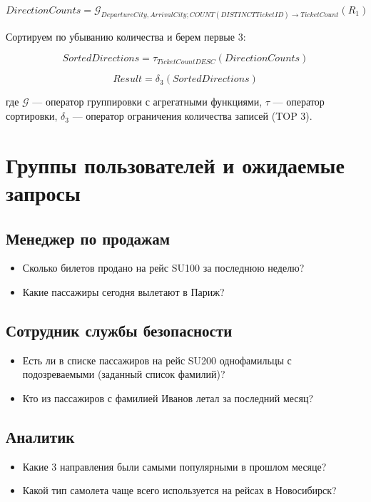 \documentclass[a4paper,12pt]{article}
\begin{document}
\[
DirectionCounts = \mathcal{G}_{DepartureCity, ArrivalCity; COUNT(DISTINCT TicketID) \rightarrow TicketCount}(R_1)
\]

Сортируем по убыванию количества и берем первые 3:

\[
SortedDirections = \tau_{TicketCount DESC}(DirectionCounts)
\]

\[
Result = \delta_{3}(SortedDirections)
\]

где $\mathcal{G}$ — оператор группировки с агрегатными функциями, $\tau$ — оператор сортировки, $\delta_{3}$ — оператор ограничения количества записей (TOP 3).

\section{Группы пользователей и ожидаемые запросы}

\subsection{Менеджер по продажам}
\begin{itemize}
    \item Сколько билетов продано на рейс SU100 за последнюю неделю?
    \item Какие пассажиры сегодня вылетают в Париж?
\end{itemize}

\subsection{Сотрудник службы безопасности}
\begin{itemize}
    \item Есть ли в списке пассажиров на рейс SU200 однофамильцы с подозреваемыми (заданный список фамилий)?
    \item Кто из пассажиров с фамилией Иванов летал за последний месяц?
\end{itemize}

\subsection{Аналитик}
\begin{itemize}
    \item Какие 3 направления были самыми популярными в прошлом месяце?
    \item Какой тип самолета чаще всего используется на рейсах в Новосибирск?
\end{itemize}
\end{document}

